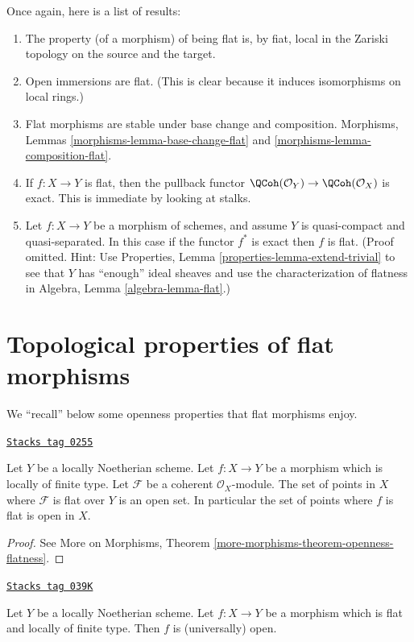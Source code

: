Once again, here is a list of results:
\begin{enumerate}
\item The property (of a morphism) of being flat is, by fiat,
local in the Zariski topology on the source and the target.
\item Open immersions are flat. (This is clear because it induces isomorphisms
on local rings.)
\item Flat morphisms are stable under base change and composition.
Morphisms, Lemmas \ref{morphisms-lemma-base-change-flat} and
\ref{morphisms-lemma-composition-flat}.
\item If $f : X \to Y$ is flat, then the pullback functor
$\QCoh(\mathcal{O}_Y) \to \QCoh(\mathcal{O}_X)$ is exact.
This is immediate by looking at stalks.
\item Let $f : X \to Y$ be a morphism of schemes, and assume $Y$
is quasi-compact and quasi-separated. In this case
if the functor $f^*$ is exact then $f$ is flat.
(Proof omitted. Hint: Use
Properties, Lemma \ref{properties-lemma-extend-trivial} to see that
$Y$ has ``enough'' ideal sheaves and use the characterization of
flatness in Algebra, Lemma \ref{algebra-lemma-flat}.)
\end{enumerate}

\section{Topological properties of flat morphisms}
\label{etale-section-topological-flat}
We ``recall'' below some openness properties that flat morphisms enjoy.

\begin{theorem}
\label{etale-theorem-flat-open}
\href{https://stacks.math.columbia.edu/tag/0255}{\texttt{Stacks tag 0255}}

Let $Y$ be a locally Noetherian scheme.
Let $f : X \to Y$ be a morphism which is locally of finite type.
Let $\mathcal{F}$ be a coherent $\mathcal{O}_X$-module.
The set of points in $X$ where $\mathcal{F}$ is flat over $Y$ is an open set.
In particular the set of points where $f$ is flat is open in $X$.
\end{theorem}

\begin{proof}
See More on Morphisms, Theorem \ref{more-morphisms-theorem-openness-flatness}.
\end{proof}

\begin{theorem}
\label{etale-theorem-flat-map-open}
\href{https://stacks.math.columbia.edu/tag/039K}{\texttt{Stacks tag 039K}}

Let $Y$ be a locally Noetherian scheme.
Let $f : X \to Y$ be a morphism which is flat and locally of finite type.
Then $f$ is (universally) open.
\end{theorem}

